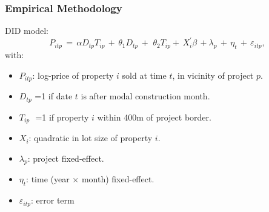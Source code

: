 \documentclass[aspectratio=149]{beamer}
\begin{document}

\begin{frame}
\frametitle{Empirical Methodology}
DID model:
\begin{equation*}
P_{itp} \, = \, \alpha D_{tp}T_{ip} \, + \,\theta_1 D_{tp} \, + \, \,\theta_2 T_{ip}+ \, X^{'}_{i}\beta \, +  \lambda_p \,  + \, \eta_{t} \, + \, \varepsilon_{itp} ,
\end{equation*}
with:
\begin{itemize}
\item $P_{itp}$: log-price of property $i$ sold at time $t$, in vicinity of project $p$.
\item $D_{tp}$ =1 if date $t$ is after modal construction month. 
\item $T_{ip}\,\,$ =1 if property $i$ within 400m of project border.
\item $X_{i}$: quadratic in lot size of property $i$.
\item $\lambda_p$: project fixed-effect.
\item $\eta_{t}$: time (year$\,\times\,$month) fixed-effect.

\item $\varepsilon_{itp}$: error term
\end{itemize}
\end{frame}

\begin{comment}
\begin{frame}
\frametitle{Empirical Methodology}
Identification:
\begin{equation*}
E[\varepsilon_{itp}|X_{i},T_{ip},D_{tp},\lambda_p,\eta_{t}]=0
\end{equation*}
\begin{itemize}
\item Identify off ``sharp'' amenity changes created by calming projects
\item Use within group variation to limit OVB - assuming that control and treatment houses are exposed to same unobservable shocks.
\end{itemize}
Concerns:
\begin{itemize}
\item negative/postive spillovers - not clear that control transactions are not affected.
\item sorting.
\end{itemize}
\end{frame}
\end{comment}
\end{document}
